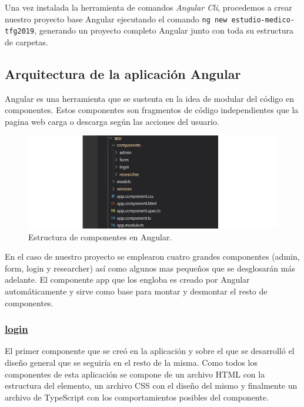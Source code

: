     \FloatBarrier
    
    Una vez instalada la herramienta de comandos \textit{Angular Cli}, procedemos a crear nuestro proyecto base Angular ejecutando el comando \texttt{ng new estudio-medico-tfg2019}, generando un proyecto completo Angular junto con toda su estructura de carpetas.
    
    
    
    \subsection{Arquitectura de la aplicación Angular}
    
    Angular es una herramienta que se sustenta en la idea de modular del código en componentes. Estos componentes son fragmentos de código independientes que la pagina web carga o descarga según las acciones del usuario. 
    
    \begin{figure}[h]
    \centering
     \includegraphics[width=1\textwidth]{images/componentesAngular.jpg}
    \caption{Estructura de componentes en Angular.}
    \end{figure}
    
    En el caso de nuestro proyecto se emplearon cuatro grandes componentes (admin, form, login y researcher) así como algunos mas pequeños que se desglosarán más adelante. El componente app que los engloba es creado por Angular automáticamente y sirve como base para montar y desmontar el resto de componentes.
    
    \subsubsection{\underline{login}}

    El primer componente que se creó en la aplicación y sobre el que se desarrolló el diseño general que se seguiría en el resto de la misma. Como todos los componentes de esta aplicación se compone de un archivo HTML con la estructura del elemento, un archivo CSS con el diseño del mismo y finalmente un archivo de TypeScript con los comportamientos posibles del componente.\newline
    
